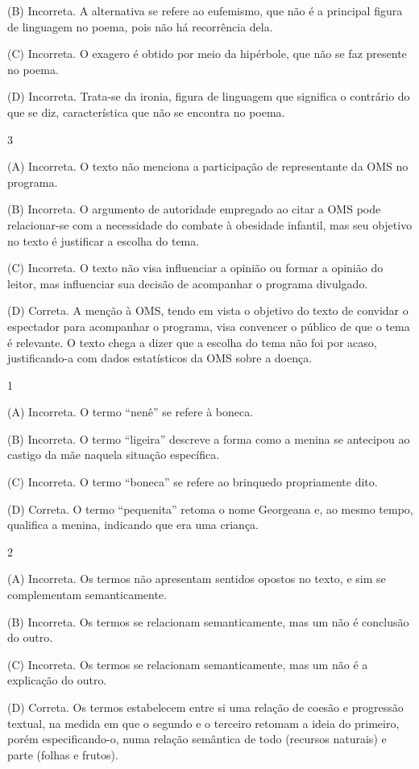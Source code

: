(B)
Incorreta. A alternativa se refere ao eufemismo, que não é a principal
figura de linguagem no poema, pois não há recorrência dela. 

(C)
Incorreta. O exagero é obtido por meio da hipérbole, que não se faz
presente no poema. 

(D) Incorreta. Trata-se da ironia, figura de
linguagem que significa o contrário do que se diz, característica que
não se encontra no poema.

\num{3}

(A) Incorreta. O texto não menciona a participação de representante da
OMS no programa. 

(B) Incorreta. O argumento de autoridade empregado ao
citar a OMS pode relacionar-se com a necessidade do combate à obesidade
infantil, mas seu objetivo no texto é justificar a escolha do tema. 

(C)
Incorreta. O texto não visa influenciar a opinião ou formar a opinião do
leitor, mas influenciar sua decisão de acompanhar o programa divulgado.

(D) Correta. A menção à OMS, tendo em vista o objetivo do texto de
convidar o espectador para acompanhar o programa, visa convencer o
público de que o tema é relevante. O texto chega a dizer que a escolha
do tema não foi por acaso, justificando-a com dados estatísticos da OMS
sobre a doença.


\num{1}

(A) Incorreta. O termo ``nenê'' se refere à boneca.

(B) Incorreta. O termo ``ligeira'' descreve a forma como a menina se
antecipou ao castigo da mãe naquela situação específica.

(C) Incorreta. O termo ``boneca'' se refere ao brinquedo propriamente
dito.

(D) Correta. O termo ``pequenita'' retoma o nome Georgeana e, ao mesmo
tempo, qualifica a menina, indicando que era uma criança.

\num{2}

(A) Incorreta. Os termos não apresentam sentidos opostos no texto, e sim
se complementam semanticamente.

(B) Incorreta. Os termos se relacionam semanticamente, mas um não é
conclusão do outro.

(C) Incorreta. Os termos se relacionam semanticamente, mas um não é a
explicação do outro.

(D) Correta. Os termos estabelecem entre si uma relação de coesão e
progressão textual, na medida em que o segundo e o terceiro retomam a
ideia do primeiro, porém especificando-o, numa relação semântica de todo
(recursos naturais) e parte (folhas e frutos).

